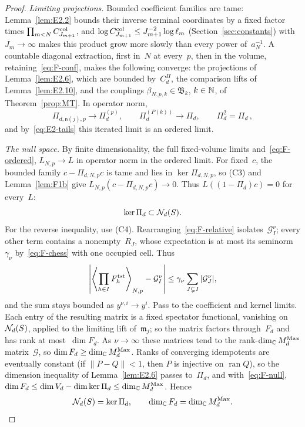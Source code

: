 \begin{proof}
\emph{Limiting projections.}\label{F:bounded-families-tame} Bounded coefficient families are tame: Lemma~\ref{lem:E2.2} bounds their inverse terminal coordinates by a fixed factor times $\prod_{m<N}C^{\rm col}_{J_{m+1}}$, and $\log C^{\rm col}_{J_{m+1}}\le J_{m+1}^{-2}\log\ell_m$ (Section~\ref{sec:constants}) with $J_m\to\infty$ makes this product grow more slowly than every power of~$a_N^{-1}$. A countable diagonal extraction, first in~$N$ at every~$p$, then in the volume, retaining~\eqref{eq:F-conf}, makes the following converge: the projections of Lemma~\ref{lem:E2.6}, which are bounded by~$C^\Pi_d$, the comparison lifts of Lemma~\ref{lem:E2.10}, and the couplings $\beta_{N,p,k}\in\mathfrak B_k$, $k\in\mathbb{N}$, of Theorem~\ref{prop:MT}. In operator norm,
\begin{equation}\label{eq:F-projections}
\Pi_{d,\mathsf n(j),p}\longrightarrow\Pi_d^{(p)},\qquad
\Pi_d^{(P(k))}\longrightarrow\Pi_d,\qquad
\Pi_d^2=\Pi_d\,,
\end{equation}
and by~\eqref{eq:E2-tails} this iterated limit is an ordered limit.

\emph{The null space.} By finite dimensionality, the full fixed-volume limits and~\eqref{eq:F-ordered}, $L_{N,p}\to L$ in operator norm in the ordered limit. For fixed~$c$, the bounded family $c-\Pi_{d,N,p}c$ is tame and lies in $\ker\Pi_{d,N,p}$, so (C3) and Lemma~\ref{lem:F1b} give $L_{N,p}(c-\Pi_{d,N,p}c)\to0$. Thus $L((1-\Pi_d)c)=0$ for every~$L$:
\begin{equation}\label{eq:F-null}
\ker\Pi_d\subset\mathcal{N}_{d}(S).
\end{equation}
For the reverse inequality, use (C4). Rearranging~\eqref{eq:F-relative} isolates~$\mathcal G^\nu_I$; every other term contains a nonempty~$R_J$, whose expectation is at most its seminorm~$\gamma_\nu$ by~\eqref{eq:F-chess} with one occupied cell. Thus
\begin{equation}\label{eq:F-rank}
\left|\left\langle\prod_{h\in I}F^{\rm tst}_h\right\rangle_{N,p}-\mathcal G^\nu_I\right|
\le\gamma_\nu\sum_{J\subsetneq I}|\mathcal G^\nu_J|,
\end{equation}
and the sum stays bounded as $y^{\nu,i}\to y^i$. Pass to the coefficient and kernel limits. Each entry of the resulting matrix is a fixed spectator functional, vanishing on~$\mathcal{N}_{d}(S)$, applied to the limiting lift of~$\mathfrak m_j$; so the matrix factors through~$F_d$ and has rank at most~$\dim F_d$. As $\nu\to\infty$ these matrices tend to the rank-$\dim_{\mathbb{C}}M_{d}^{\mathrm{Max}}$ matrix~$\mathcal G$, so $\dim F_d\ge\dim_{\mathbb{C}}M_{d}^{\mathrm{Max}}$. Ranks of converging idempotents are eventually constant (if $\|P-Q\|<1$, then $P$ is injective on $\operatorname{ran}Q$), so the dimension inequality of Lemma~\ref{lem:E2.6} passes to~$\Pi_d$, and with~\eqref{eq:F-null}, $\dim F_d\le\dim V_d-\dim\ker\Pi_d\le\dim_{\mathbb{C}}M_{d}^{\mathrm{Max}}$. Hence
\begin{equation}\label{eq:F-dimension}
\mathcal{N}_{d}(S)=\ker\Pi_d,\qquad \dim_{\mathbb{C}} F_d=\dim_{\mathbb{C}}M_{d}^{\mathrm{Max}}.
\end{equation}


\end{proof}
